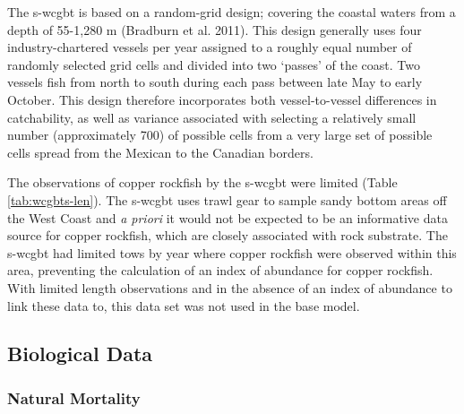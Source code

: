 \documentclass[11pt,
  english,
  a4paper,
]{article}
\begin{document}
\leavevmode\tagmcend\tagstructend


The \gls{s-wcgbt} is based on a random-grid design; covering the coastal waters from a depth of 55-1,280 m {(Bradburn et al. 2011)\leavevmode\tagmcend\tagstructend}. This design generally uses four industry-chartered vessels per year assigned to a roughly equal number of randomly selected grid cells and divided into two `passes' of the coast. Two vessels fish from north to south during each pass between late May to early October. This design therefore incorporates both vessel-to-vessel differences in catchability, as well as variance associated with selecting a relatively small number (approximately 700) of possible cells from a very large set of possible cells spread from the Mexican to the Canadian borders.

\leavevmode\tagmcend\tagstructend\par


The observations of copper rockfish by the \gls{s-wcgbt} were limited (Table \ref{tab:wcgbts-len}). The \gls{s-wcgbt} uses trawl gear to sample sandy bottom areas off the West Coast and \emph{a priori} it would not be expected to be an informative data source for copper rockfish, which are closely associated with rock substrate. The \gls{s-wcgbt} had limited tows by year where copper rockfish were observed within this area, preventing the calculation of an index of abundance for copper rockfish. With limited length observations and in the absence of an index of abundance to link these data to, this data set was not used in the base model.

\leavevmode\tagmcend\tagstructend\par


\hypertarget{bio-data}{%
\subsection{Biological Data}\label{bio-data}}

\leavevmode\tagmcend\tagstructend


\hypertarget{natural-mortality}{%
\subsubsection{Natural Mortality}\label{natural-mortality}}
\end{document}

